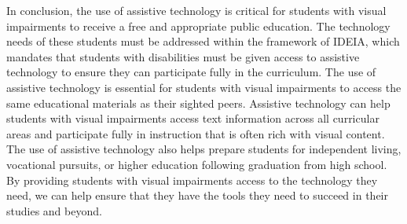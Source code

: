 In conclusion, the use of assistive technology is critical for students with visual impairments to receive a free and appropriate public education. The technology needs of these students must be addressed within the framework of IDEIA\footnotemark[\value{footnote}], which mandates that students with disabilities must be given access to assistive technology to ensure they can participate fully in the curriculum. The use of assistive technology is essential for students with visual impairments to access the same educational materials as their sighted peers. Assistive technology can help students with visual impairments access text information across all curricular areas and participate fully in instruction that is often rich with visual content. The use of assistive technology also helps prepare students for independent living, vocational pursuits, or higher education following graduation from high school. By providing students with visual impairments access to the technology they need, we can help ensure that they have the tools they need to succeed in their studies and beyond.
